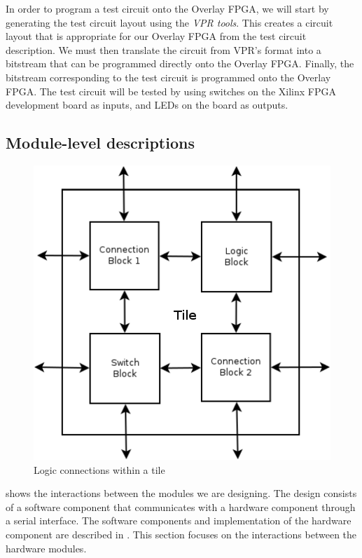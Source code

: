 In order to program a test circuit onto the Overlay FPGA, we will start by generating the test circuit layout using the \emph{VPR tools}.
This creates a circuit layout that is appropriate for our Overlay FPGA from the test circuit description.
We must then translate the circuit from VPR's format into a bitstream that can be programmed directly onto the Overlay FPGA.
Finally, the bitstream corresponding to the test circuit is programmed onto the Overlay FPGA.
The test circuit will be tested by using switches on the Xilinx FPGA development board as inputs, and LEDs on the board as outputs.



\subsection{Module-level descriptions} %

\begin{figure}[!h]
	\centering
	\includegraphics[scale=0.6]{tile.png}
	\caption{Logic connections within a tile}
	\label{tile-diagram}
\end{figure}

 shows the interactions between the modules we are designing.
The design consists of a software component that communicates with a hardware component through a serial interface.
The software components and implementation of the hardware component are described in .
This section focuses on the interactions between the hardware modules.

